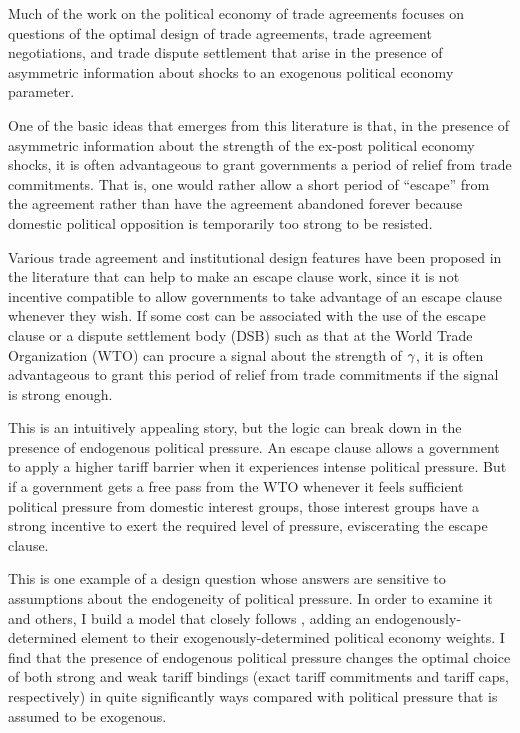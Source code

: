 Much of the work on the political economy of trade agreements focuses on questions of the optimal design of trade agreements, trade agreement negotiations, and trade dispute settlement that arise in the presence of asymmetric information about shocks to an exogenous political economy parameter. 

One of the basic ideas that emerges from this literature is that, in the presence of asymmetric information about the strength of the ex-post political economy shocks, it is often advantageous to grant governments a period of relief from trade commitments. That is, one would rather allow a short period of ``escape'' from the agreement rather than have the agreement abandoned forever because domestic political opposition is temporarily too strong to be resisted.

Various trade agreement and institutional design features have been proposed in the literature that can help to make an escape clause work, since it is not incentive compatible to allow governments to take advantage of an escape clause whenever they wish. If some cost can be associated with the use of the escape clause or a dispute settlement body (DSB) such as that at the World Trade Organization (WTO) can procure a signal about the strength of $\gamma$, it is often advantageous to grant this period of relief from trade commitments if the signal is strong enough. 


This is an intuitively appealing story, but the logic can break down in the presence of endogenous political pressure. An escape clause allows a government to apply a higher tariff barrier when it experiences intense political pressure. But if a government gets a free pass from the WTO whenever it feels sufficient political pressure from domestic interest groups, those interest groups have a strong incentive to exert the required level of pressure, eviscerating the escape clause.

This is one example of a design question whose answers are sensitive to assumptions about the endogeneity of political pressure. In order to examine it and others, I build a model that closely follows \Textcite{bs2005}, adding an endogenously-determined element to their exogenously-determined political economy weights. I find that the presence of endogenous political pressure changes the optimal choice of both strong and weak tariff bindings (exact tariff commitments and tariff caps, respectively) in quite significantly ways compared with political pressure that is assumed to be exogenous. 

